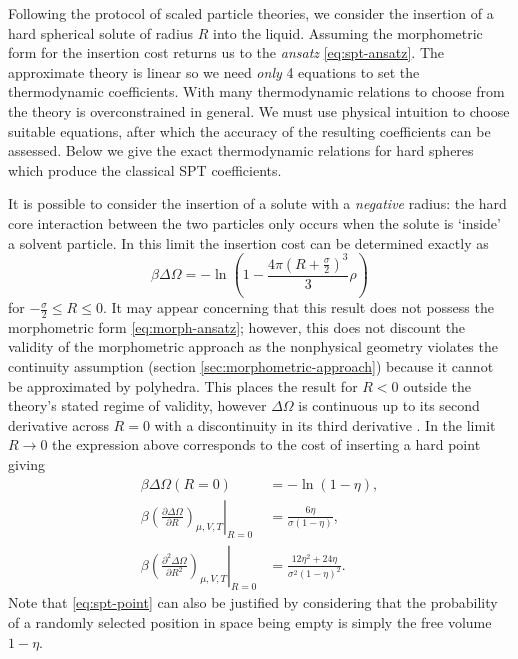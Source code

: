 \documentclass[11pt,twoside]{report}
\begin{document}
Following the protocol of scaled particle theories, we consider the insertion of a hard spherical solute of radius $R$ into the liquid.
Assuming the morphometric form for the insertion cost returns us to the \emph{ansatz} \eqref{eq:spt-ansatz}.
The approximate theory is linear so we need \emph{only} 4 equations to set the thermodynamic coefficients.
With many thermodynamic relations to choose from the theory is overconstrained in general.
We must use physical intuition to choose suitable equations, after which the accuracy of the resulting coefficients can be assessed.
Below we give the exact thermodynamic relations for hard spheres which produce the classical SPT coefficients.

It is possible to consider the insertion of a solute with a \emph{negative} radius: the hard core interaction between the two particles only occurs when the solute is `inside' a solvent particle.
In this limit the insertion cost can be determined exactly as \cite{ReissJCP1959}
\begin{equation}
  \beta \Delta \Omega =
  -\ln{\left(
    1 - \frac{4\pi \left(R + \frac{\sigma}{2}\right)^3}{3} \rho
    \right)}
\end{equation}
for $-\frac{\sigma}{2} \le R \le 0$.
It may appear concerning that this result does not possess the morphometric form \eqref{eq:morph-ansatz}; however, this does not discount the validity of the morphometric approach as the nonphysical geometry violates the continuity assumption (section \ref{sec:morphometric-approach}) because it cannot be approximated by polyhedra.
This places the result for $R < 0$ outside the theory's stated regime of validity, however $\Delta\Omega$ is continuous up to its second derivative across $R=0$ with a discontinuity in its third derivative \cite{ReissJCP1959}.
In the limit $R \to 0$ the expression above corresponds to the cost of inserting a hard point giving
\begin{subequations}\label{eq:spt-origin-continuity}
  \begin{align}
    \label{eq:spt-point}
    \beta \Delta\Omega(R=0)
    &=
    -\ln{(1- \eta)},
    \\
    \label{eq:spt-point-d1}
    \beta \left. \left(
    \frac{\partial \Delta\Omega}{\partial R}
    \right)_{\mu, V, T} \right|_{R=0}
    &=
    \frac{6\eta}{\sigma (1- \eta)},
    \\
    \label{eq:spt-point-d2}
    \beta \left. \left(
    \frac{\partial^2 \Delta\Omega}{\partial R^2}
    \right)_{\mu, V, T} \right|_{R=0}
    &=
    \frac{12\eta^2 + 24\eta}{\sigma^2 (1- \eta)^2}.
 \end{align}
\end{subequations}
Note that \eqref{eq:spt-point} can also be justified by considering that the probability of a randomly selected position in space being empty is simply the free volume $1-\eta$.
\end{document}
